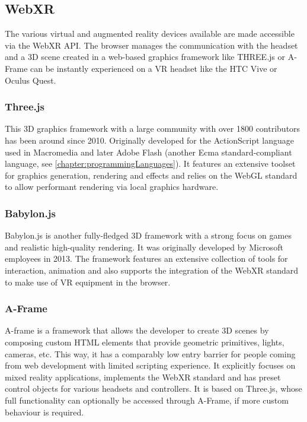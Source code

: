 \subsection{WebXR}

The various virtual and augmented reality devices available are made accessible via the WebXR \ac{API}. The browser manages the communication with the headset and a \ac{3D} scene created in a web-based graphics framework like THREE.js or A-Frame can be instantly experienced on a \ac{VR} headset like the HTC Vive or Oculus Quest.



\subsubsection{Three.js}

This \ac{3D} graphics framework with a large community with over 1800 contributors has been around since 2010. Originally developed for the ActionScript language used in Macromedia and later Adobe Flash (another Ecma standard-compliant language, see \autoref{chapter:programmingLanguages}). It features an extensive toolset for graphics generation, rendering and effects and relies on the WebGL standard to allow performant rendering via local graphics hardware.

\subsubsection{Babylon.js}

Babylon.js is another fully-fledged \ac{3D} framework with a strong focus on games and realistic high-quality rendering. It was originally developed by Microsoft employees in 2013. The framework features an extensive collection of tools for interaction, animation and also supports the integration of the \ac{WebXR} standard to make use of \ac{VR} equipment in the browser.

\subsubsection{A-Frame}

A-frame is a framework that allows the developer to create \ac{3D} scenes by composing custom HTML elements that provide geometric primitives, lights, cameras, etc. This way, it has a comparably low entry barrier for people coming from web development with limited scripting experience. It explicitly focuses on mixed reality applications, implements the WebXR standard and has preset control objects for various headsets and controllers. It is based on Three.js, whose full functionality can optionally be accessed through A-Frame, if more custom behaviour is required.

